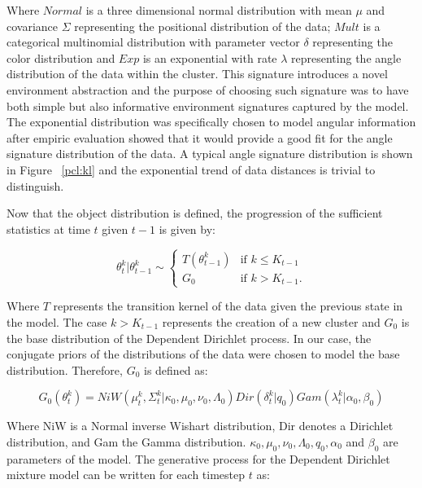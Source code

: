 \documentclass [twoside,hidelinks]{article}
\begin{document}
Where $Normal$ is a three dimensional normal distribution with mean $\mu$ and covariance $\Sigma$ representing the positional distribution of the data; $Mult$ is a categorical multinomial distribution with parameter vector $\delta$ representing the color distribution and $Exp$ is an exponential with rate $\lambda$ representing the angle distribution of the data within the cluster. This signature introduces a novel environment abstraction and the purpose of choosing such signature was to have both simple but also informative environment signatures captured by the model. The exponential distribution was specifically chosen to model angular information after empiric evaluation showed that it would provide a good fit for the angle signature distribution of the data. A typical angle signature distribution is shown in Figure ~\ref{pcl:kl} and the exponential trend of data distances is trivial to distinguish.

Now that the object distribution is defined, the progression of the sufficient statistics at time $t$ given $t-1$ is given by:

   \begin{center}
\begin{equation}
    \theta_t^k | \theta_{t-1}^k \sim
   \begin{cases} T  (\theta_{t-1}^k) &\mbox{if } k \leq K_{t-1} \\
   G_0 & \mbox{if } k > K_{t-1}. \end{cases}
\end{equation}
   \end{center}
Where $T$ represents the transition kernel of the data given the previous state in the model. The case $ k > K_{t-1} $ represents the creation of a new cluster and $G_0$ is the base distribution of the Dependent Dirichlet process. In our case, the conjugate priors of the distributions of the data were chosen to model the base distribution. Therefore, $G_0$ is defined as:

\begin{equation}
 G_0 (\theta_t^k)  = NiW ( \mu_t^k, \Sigma_t^k | \kappa_0, \mu_0, \nu_0, \Lambda_0 ) Dir (\delta_t^k | q_0) Gam ( \lambda_t^k | \alpha_0, \beta_0)
 \end{equation}

Where NiW is a Normal inverse Wishart distribution, Dir denotes a Dirichlet distribution, and Gam the Gamma distribution. $ \kappa_0, \mu_0, \nu_0, \Lambda_0, q_0,\alpha_0$ and $\beta_0$ are parameters of the model. The generative process for the Dependent Dirichlet mixture model can be written for each timestep $t$ as:
\end{document}
